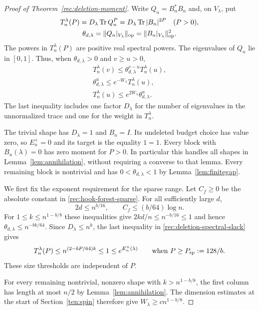 \begin{proof}[Proof of Theorem~\ref{rec:deletion-moment}]
Write $Q_n=B_n^*B_n$ and, on $V_\lambda$, put
\[
 \begin{gathered}
 T_n^\lambda(P)=D_\lambda\operatorname{Tr} Q_n^P
                =D_\lambda\operatorname{Tr}|B_n|^{2P}\quad(P>0),
 \\
 \theta_{d,\lambda}=\|Q_n|_{V_\lambda}\|_{\mathrm{op}}
       =\|B_n|_{V_\lambda}\|_{\mathrm{op}}^2.
 \end{gathered}
\]
The powers in $T_n^\lambda(P)$ are positive real spectral powers.
The eigenvalues of $Q_n$
lie in $[0,1]$. Thus, when $\theta_{d,\lambda}>0$ and $v\ge u>0$,
\begin{equation}\label{rec:deletion-spectral-slack}
 \begin{gathered}
 T_n^\lambda(v)\le\theta_{d,\lambda}^{v-u}T_n^\lambda(u),
 \\
 \theta_{d,\lambda}^u\le e^{-W_\lambda}T_n^\lambda(u),
 \\
 T_n^\lambda(u)\le e^{2W_\lambda}\theta_{d,\lambda}^u.
 \end{gathered}
\end{equation}
The last inequality includes one factor $D_\lambda$ for the number
of eigenvalues in the unnormalized trace and one for the weight in
$T_n^\lambda$.

The trivial shape has $D_\lambda=1$ and $B_n=I$. Its undeleted
budget choice has value zero, so $E_n^+=0$ and its target is the
equality $1=1$. Every block with $B_n(\lambda)=0$ has zero moment
for $P>0$. In particular this handles all shapes in
Lemma~\ref{lem:annihilation}, without requiring a converse to that
lemma. Every remaining block is nontrivial and has
$0<\theta_{d,\lambda}<1$ by Lemma~\ref{lem:finitegap}.

We first fix the exponent requirement for the sparse range. Let
$C_f\ge0$ be the absolute constant in
\eqref{rec:hook-forest-sparse}. For all sufficiently large $d$,
\[
 2d\le n^{b/16},\qquad C_f\le(b/64)\log n.
\]
For $1\le k\le n^{1-b/8}$ these inequalities give
$2kd/n\le n^{-b/16}\le1$ and hence
$\theta_{d,\lambda}\le n^{-bk/64}$. Since
$D_\lambda\le n^k$, the last inequality in
\eqref{rec:deletion-spectral-slack} gives
\[
 T_n^\lambda(P)\le n^{(2-bP/64)k}\le1\le e^{E_n^+(\lambda)}
 \qquad\text{when }P\ge P_{\rm sp}:=128/b.
\]
These size thresholds are independent of $P$.

For every remaining nontrivial, nonzero shape with $k>n^{1-b/8}$,
the first column has length at most $n/2$ by
Lemma~\ref{lem:annihilation}. The dimension estimates at the start of
Section~\ref{ten:spin} therefore give
$W_\lambda\ge c n^{1-b/8}$.


\end{proof}
